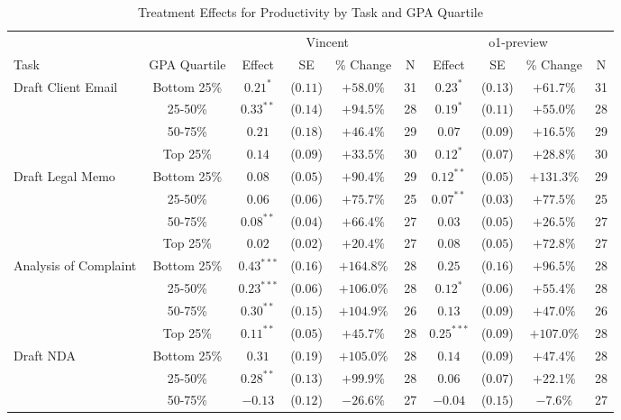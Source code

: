 \begin{table}[!htbp]
\centering
\caption{Treatment Effects for Productivity by Task and GPA Quartile}
\label{tab:productivity_gpa}
\begin{tabular}{lccccccccc}
\hline\hline
& & \multicolumn{4}{c}{Vincent} & \multicolumn{4}{c}{o1-preview} \\
\cline{3-10}
Task & GPA Quartile & Effect & SE & \% Change & N & Effect & SE & \% Change & N \\
\hline
\multirow{4}{*}{Draft Client Email} & Bottom 25\% & $0.21^{*}$ & ($0.11$) & $+58.0\%$ & 31 & $0.23^{*}$ & ($0.13$) & $+61.7\%$ & 31 \\
& 25-50\% & $0.33^{**}$ & ($0.14$) & $+94.5\%$ & 28 & $0.19^{*}$ & ($0.11$) & $+55.0\%$ & 28 \\
& 50-75\% & $0.21$ & ($0.18$) & $+46.4\%$ & 29 & $0.07$ & ($0.09$) & $+16.5\%$ & 29 \\
& Top 25\% & $0.14$ & ($0.09$) & $+33.5\%$ & 30 & $0.12^{*}$ & ($0.07$) & $+28.8\%$ & 30 \\
\hline
\multirow{4}{*}{Draft Legal Memo} & Bottom 25\% & $0.08$ & ($0.05$) & $+90.4\%$ & 29 & $0.12^{**}$ & ($0.05$) & $+131.3\%$ & 29 \\
& 25-50\% & $0.06$ & ($0.06$) & $+75.7\%$ & 25 & $0.07^{**}$ & ($0.03$) & $+77.5\%$ & 25 \\
& 50-75\% & $0.08^{**}$ & ($0.04$) & $+66.4\%$ & 27 & $0.03$ & ($0.05$) & $+26.5\%$ & 27 \\
& Top 25\% & $0.02$ & ($0.02$) & $+20.4\%$ & 27 & $0.08$ & ($0.05$) & $+72.8\%$ & 27 \\
\hline
\multirow{4}{*}{Analysis of Complaint} & Bottom 25\% & $0.43^{***}$ & ($0.16$) & $+164.8\%$ & 28 & $0.25$ & ($0.16$) & $+96.5\%$ & 28 \\
& 25-50\% & $0.23^{***}$ & ($0.06$) & $+106.0\%$ & 28 & $0.12^{*}$ & ($0.06$) & $+55.4\%$ & 28 \\
& 50-75\% & $0.30^{**}$ & ($0.15$) & $+104.9\%$ & 26 & $0.13$ & ($0.09$) & $+47.0\%$ & 26 \\
& Top 25\% & $0.11^{**}$ & ($0.05$) & $+45.7\%$ & 28 & $0.25^{***}$ & ($0.09$) & $+107.0\%$ & 28 \\
\hline
\multirow{4}{*}{Draft NDA} & Bottom 25\% & $0.31$ & ($0.19$) & $+105.0\%$ & 28 & $0.14$ & ($0.09$) & $+47.4\%$ & 28 \\
& 25-50\% & $0.28^{**}$ & ($0.13$) & $+99.9\%$ & 28 & $0.06$ & ($0.07$) & $+22.1\%$ & 28 \\
& 50-75\% & $-0.13$ & ($0.12$) & $-26.6\%$ & 27 & $-0.04$ & ($0.15$) & $-7.6\%$ & 27 \\

\end{tabular}
\end{table}
